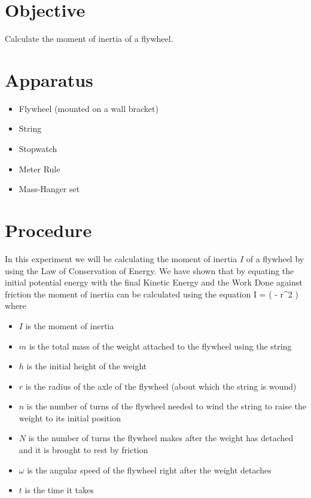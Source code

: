 \section{Objective}

    Calculate the moment of inertia of a flywheel.


\section{Apparatus}

    \begin{itemize}

        \item Flywheel (mounted on a wall bracket)
        \item String
        \item Stopwatch
        \item Meter Rule
        \item Mass-Hanger set

    \end{itemize}


\section{Procedure}

    In this experiment we will be calculating the moment of inertia $I$ of a flywheel by using the Law of Conservation of Energy. We have shown that by equating the initial potential energy with the final Kinetic Energy and the Work Done against friction the moment of inertia can be calculated using the equation
    \beq \label{I}
        I =  \left(  - r^2 \right)
    \eeq
    where
    \begin{itemize}

        \item $I$ is the moment of inertia
        \item $m$ is the total mass of the weight attached to the flywheel using the string
        \item $h$ is the initial height of the weight
        \item $r$ is the radius of the axle of the flywheel (about which the string is wound)
        \item $n$ is the number of turns of the flywheel needed to wind the string to raise the weight to its initial position
        \item $N$ is the number of turns the flywheel makes after the weight has detached and it is brought to rest by friction
        \item $\omega$ is the angular speed of the flywheel right after the weight detaches
        \item $t$ is the time it takes

    \end{itemize}

